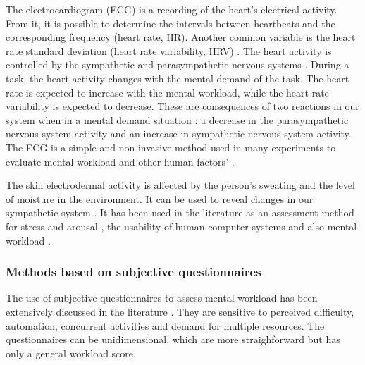         The electrocardiogram (ECG) is a recording of the heart's electrical activity. From it, it is possible to determine the intervals between heartbeats and the corresponding frequency (heart rate, HR). Another common variable is the heart rate standard deviation (heart rate variability, HRV) \cite{cain2007review}. The heart activity is controlled by the sympathetic and parasympathetic nervous systems \cite{stanton2004handbook}. During a task, the heart activity changes with the mental demand of the task. The heart rate is expected to increase with the mental workload, while the heart rate variability is expected to decrease. These are consequences of two reactions in our system when in a mental demand situation \cite{stanton2004handbook}: a decrease in the parasympathetic nervous system activity and an increase in sympathetic nervous system activity. The ECG is a simple and non-invasive method used in many experiments to evaluate mental workload and other human factors' \cite{mohanavelu2020cognitive, mansikka2016fighter, zhang2014detection}.
                
         The skin electrodermal activity is affected by the person's sweating and the level of moisture in the environment. It can be used to reveal changes in our sympathetic system \cite{nourbakhsh2012using, shi2007galvanic}. It has been used in the literature as an assessment method for stress and arousal \cite{nourbakhsh2012using, stanton2004handbook, shi2007galvanic}, the usability of human-computer systems \cite{shi2007galvanic} and also mental workload \cite{zhang2014detection, borghini2014measuring}.
    
    \subsubsection*{Methods based on subjective questionnaires}

        The use of subjective questionnaires to assess mental workload has been extensively discussed in the literature \cite{sanders1998human, stanton2004handbook}. They are sensitive to perceived difficulty, automation, concurrent activities and demand for multiple resources. The questionnaires can be unidimensional, which are more straighforward but has only a general workload score.

